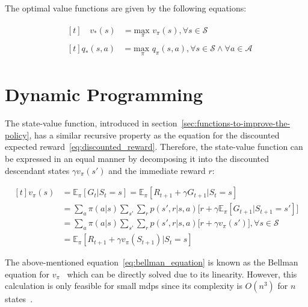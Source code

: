 \documentclass[draft,final]{vutinfth} %
\newcommand{\p}[1]{see p. #1}
\begin{document}
    The optimal value functions are given by the following equations:

    \begin{align}
        &\begin{aligned}[t]
             \phantom{,a}v_*(s) &= \underset{\pi}{\text{max }}v_\pi(s), \forall s \in \mathcal{S}\label{eq:optimal1}
        \end{aligned}\\
        &\begin{aligned}[t]
             q_*(s,a) &= \underset{\pi}{\text{max }}q_\pi(s,a), \forall s \in \mathcal{S} \land \forall a \in \mathcal{A}\label{eq:optimal2}
        \end{aligned}
    \end{align}


    \section{Dynamic Programming}

    The state-value function, introduced in section~\ref{sec:functions-to-improve-the-policy}, has a similar recursive property as the equation for the discounted expected reward~\eqref{eq:discounted_reward}.
    Therefore, the state-value function can be expressed in an equal manner by decomposing it into the discounted descendant states $\gamma v_\pi(s')$ and the immediate reward $r$:

    \begin{equation}
        \begin{aligned}[t]
            v_\pi(s) &= \mathbb{E}_\pi[G_t|S_t=s] = \mathbb{E}_\pi[R_{t+1} + \gamma G_{t+1}|S_t=s] \\
            &  =  \sum_{a} \pi(a|s) \sum_{s'}\sum_{r} p(s',r|s,a) \bigg[r + \gamma \mathbb{E}_\pi[G_{t+1}|S_{t+1} = s'] \bigg] \\
            &  =  \sum_{a} \pi(a|s) \sum_{s'}\sum_{r} p(s',r|s,a) \bigg[r + \gamma v_{\pi}(s') \bigg], \forall s \in \mathcal{S} \\
            &  =  \mathbb{E}_\pi[R_{t+1} + \gamma v_\pi(S_{t+1})|S_t=s]
            \label{eq:bellman_equation}
        \end{aligned}
    \end{equation}

    The above-mentioned equation~\eqref{eq:bellman_equation} is known as the Bellman equation for $v_\pi$~\citep[\p{59}]{sutton_reinforcement_2018} which can be directly solved due to its linearity.
    However, this calculation is only feasible for small \glspl{mdp} since its complexity is $O(n^3)$ for $n$ states~.
\end{document}
